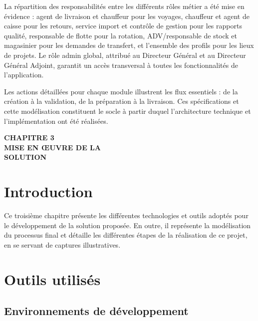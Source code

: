 \documentclass[12pt,a4paper]{article}
\renewcommand{\thesection}{1.\arabic{section}}
\begin{document}
La répartition des responsabilités entre les différents rôles métier a été mise en évidence : agent de livraison et chauffeur pour les voyages, chauffeur et agent de caisse pour les retours, service import et contrôle de gestion pour les rapports qualité, responsable de flotte pour la rotation, ADV/responsable de stock et magasinier pour les demandes de transfert, et l'ensemble des profils pour les lieux de projets. Le rôle admin global, attribué au Directeur Général et au Directeur Général Adjoint, garantit un accès transversal à toutes les fonctionnalités de l'application.

Les actions détaillées pour chaque module illustrent les flux essentiels : de la création à la validation, de la préparation à la livraison. Ces spécifications et cette modélisation constituent le socle à partir duquel l'architecture technique et l'implémentation ont été réalisées.

    \newpage
    \thispagestyle{empty}
    \vspace*{\fill}
    \begin{center}
    {\Huge \textbf{CHAPITRE 3}}\\[0.8em]
    {\LARGE \textbf{MISE EN ŒUVRE DE LA\\[0.4em]SOLUTION}}
    \end{center}
    \vspace*{\fill}

    \newpage
    \renewcommand{\thesection}{3.\arabic{section}}
    \setcounter{section}{0}


    \section{Introduction}
    Ce troisième chapitre présente les différentes technologies et outils adoptés pour le développement de la solution proposée. En outre, il représente la modélisation du processus final et détaille les différentes étapes de la réalisation de ce projet, en se servant de captures illustratives.

    \section{Outils utilisés}

    \subsection{Environnements de développement}
\end{document}
